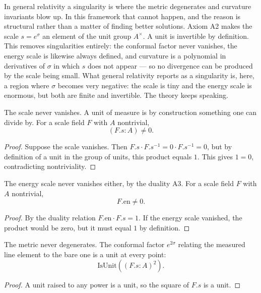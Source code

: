In general relativity a singularity is where the metric degenerates and curvature invariants blow up. In this framework that cannot happen, and the reason is structural rather than a matter of finding better solutions. Axiom A2 makes the scale $s = e^\sigma$ an element of the unit group $A^\times$. A unit is invertible by definition. This removes singularities entirely: the conformal factor never vanishes, the energy scale is likewise always defined, and curvature is a polynomial in derivatives of $\sigma$ in which $s$ does not appear — so no divergence can be produced by the scale being small. What general relativity reports as a singularity is, here, a region where $\sigma$ becomes very negative: the scale is tiny and the energy scale is enormous, but both are finite and invertible. The theory keeps speaking.

\begin{theorem}
The scale never vanishes. A unit of measure is by construction something one can divide by. For a scale field $F$ with $A$ nontrivial,
\[
(F.s : A) \neq 0.
\]
\begin{proof}
Suppose the scale vanishes. Then $F.s \cdot F.s^{-1} = 0 \cdot F.s^{-1} = 0$, but by definition of a unit in the group of units, this product equals $1$. This gives $1 = 0$, contradicting nontriviality.
\end{proof}
\end{theorem}

\begin{theorem}
The energy scale never vanishes either, by the duality A3. For a scale field $F$ with $A$ nontrivial,
\[
F.\text{en} \neq 0.
\]
\begin{proof}
By the duality relation $F.\text{en} \cdot F.s = 1$. If the energy scale vanished, the product would be zero, but it must equal $1$ by definition.
\end{proof}
\end{theorem}

\begin{theorem}
The metric never degenerates. The conformal factor $e^{2\sigma}$ relating the measured line element to the bare one is a unit at every point:
\[
\text{IsUnit}((F.s : A)^2).
\]
\begin{proof}
A unit raised to any power is a unit, so the square of $F.s$ is a unit.
\end{proof}
\end{theorem}

